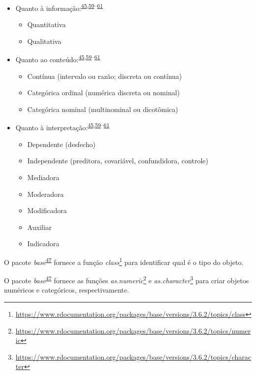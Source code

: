 \documentclass[
  a4paper,
]{book}
\renewcommand{\href}[2]{#2\footnote{\url{#1}}}
\newenvironment{infobox}[1]
  {
  \begin{itemize}
  \renewcommand{\labelitemi}{
    \raisebox{-.7\height}[0pt][0pt]{
      {\setkeys{Gin}{width=3em,keepaspectratio}
        \texttt{[image: \#1]}}
    }
  }
  \setlength{\fboxsep}{1em}
  \begin{blackbox}
  \item
  }
  {
  \end{blackbox}
  \end{itemize}
  }
\begin{document}
\begin{itemize}
\item
  Quanto à informação:\textsuperscript{\protect\hyperlink{ref-vetter2017}{45},\protect\hyperlink{ref-Ali2016}{59}--\protect\hyperlink{ref-kaliyadan2019}{61}}

  \begin{itemize}
  \item
    Quantitativa
  \item
    Qualitativa
  \end{itemize}
\item
  Quanto ao conteúdo:\textsuperscript{\protect\hyperlink{ref-vetter2017}{45},\protect\hyperlink{ref-Ali2016}{59}--\protect\hyperlink{ref-kaliyadan2019}{61}}

  \begin{itemize}
  \item
    Contínua (intervalo ou razão; discreta ou contínua)
  \item
    Categórica ordinal (numérica discreta ou nominal)
  \item
    Categórica nominal (multinominal ou dicotômica)
  \end{itemize}
\item
  Quanto à interpretação:\textsuperscript{\protect\hyperlink{ref-vetter2017}{45},\protect\hyperlink{ref-Ali2016}{59}--\protect\hyperlink{ref-kaliyadan2019}{61}}

  \begin{itemize}
  \item
    Dependente (desfecho)
  \item
    Independente (preditora, covariável, confundidora, controle)
  \item
    Mediadora
  \item
    Moderadora
  \item
    Modificadora
  \item
    Auxiliar
  \item
    Indicadora
  \end{itemize}
\end{itemize}

\begin{infobox}{images/Rlogo}
O pacote \emph{base}\textsuperscript{\protect\hyperlink{ref-base-2}{47}} fornece a função \href{https://www.rdocumentation.org/packages/base/versions/3.6.2/topics/class}{\emph{class}} para identificar qual é o tipo do objeto.

\end{infobox}

\begin{infobox}{images/Rlogo}
O pacote \emph{base}\textsuperscript{\protect\hyperlink{ref-base-2}{47}} fornece as funções \href{https://www.rdocumentation.org/packages/base/versions/3.6.2/topics/numeric}{\emph{as.numeric}} e \href{https://www.rdocumentation.org/packages/base/versions/3.6.2/topics/character}{\emph{as.character}} para criar objetos numéricos e categóricos, respectivamente.

\end{infobox}
\end{document}
